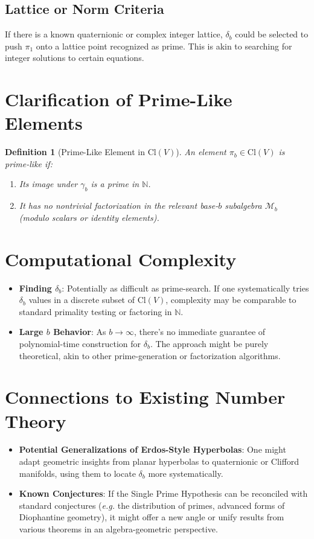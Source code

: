 \documentclass[11pt]{article}
\newtheorem{definition}{Definition}
\begin{document}
\subsection{Lattice or Norm Criteria}
If there is a known quaternionic or complex integer lattice, 
$\delta_b$ could be selected to push $\pi_1$ onto a lattice point 
recognized as prime. This is akin to searching for integer solutions 
to certain equations. 

\section{Clarification of Prime-Like Elements}
\label{sec:PrimeLike}

\begin{definition}[Prime-Like Element in $\mathrm{Cl}(V)$]
An element $\pi_b \in \mathrm{Cl}(V)$ is \emph{prime-like} if:
\begin{enumerate}
\item Its image under $\gamma_b$ is a prime in $\mathbb{N}$.
\item It has no nontrivial factorization in the relevant base-$b$ subalgebra 
  $\mathcal{M}_b$ (modulo scalars or identity elements).
\end{enumerate}
\end{definition}

\section{Computational Complexity}

\begin{itemize}
\item \textbf{Finding $\delta_b$}: Potentially as difficult as prime-search. 
  If one systematically tries $\delta_b$ values in a discrete subset of $\mathrm{Cl}(V)$, 
  complexity may be comparable to standard primality testing or factoring in $\mathbb{N}$.
\item \textbf{Large $b$ Behavior}: As $b\to\infty$, 
  there's no immediate guarantee of polynomial-time construction for $\delta_b$. 
  The approach might be purely theoretical, akin to other prime-generation 
  or factorization algorithms.
\end{itemize}

\section{Connections to Existing Number Theory}

\begin{itemize}
\item \textbf{Potential Generalizations of Erdos-Style Hyperbolas}: 
  One might adapt geometric insights from planar hyperbolas to 
  quaternionic or Clifford manifolds, using them to locate $\delta_b$ 
  more systematically.
\item \textbf{Known Conjectures}: If the Single Prime Hypothesis can be reconciled 
  with standard conjectures (\emph{e.g.} the distribution of primes, advanced 
  forms of Diophantine geometry), it might offer a new angle or unify results 
  from various theorems in an algebra-geometric perspective.
\end{itemize}
\end{document}
